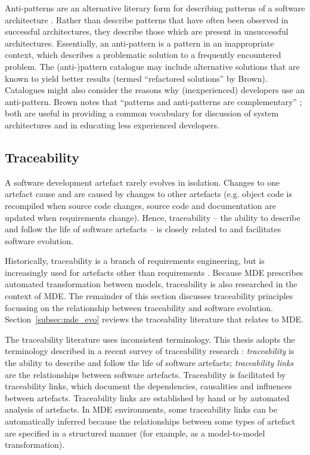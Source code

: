 Anti-patterns are an alternative literary form for describing patterns of a software architecture \cite{brown98antipatterns}. Rather than describe patterns that have often been observed in successful architectures, they describe those which are present in unsuccessful architectures. Essentially, an anti-pattern is a pattern in an inappropriate context, which describes a problematic solution to a frequently encountered problem. The (anti-)pattern catalogue may include alternative solutions that are known to yield better results (termed ``refactored solutions'' by Brown). Catalogues might also consider the reasons why (inexperienced) developers use an anti-pattern. Brown notes that ``patterns and anti-patterns are complementary'' \cite[pg. 13]{brown98antipatterns}; both are useful in providing a common vocabulary for discussion of system architectures and in educating less experienced developers.


\subsection{Traceability}
\label{subsec:traceability}
A software development artefact rarely evolves in isolation. Changes to one artefact cause and are caused by changes to other artefacts (e.g. object code is recompiled when source code changes, source code and documentation are updated when requirements change). Hence, traceability -- the ability to describe and follow the life of software artefacts \cite{winkler09survey,lago09scoped} -- is closely related to and facilitates software evolution.

Historically, traceability is a branch of requirements engineering, but is increasingly used for artefacts other than requirements \cite{winkler09survey}. Because MDE prescribes automated transformation between models, traceability is also researched in the context of MDE. The remainder of this section discusses traceability principles focussing on the relationship between traceability and software evolution. Section~\ref{subsec:mde_evo} reviews the traceability literature that relates to MDE.

The traceability literature uses inconsistent terminology. This thesis adopts the terminology described in a recent survey of traceability research \cite{winkler09survey}: \emph{traceability} is the ability to describe and follow the life of software artefacts; \emph{traceability links} are the relationships between software artefacts. Traceability is facilitated by traceability links, which document the dependencies, causalities and influences between artefacts. Traceability links are established by hand or by automated analysis of artefacts. In MDE environments, some traceability links can be automatically inferred because the relationships between some types of artefact are specified in a structured manner (for example, as a model-to-model transformation).

